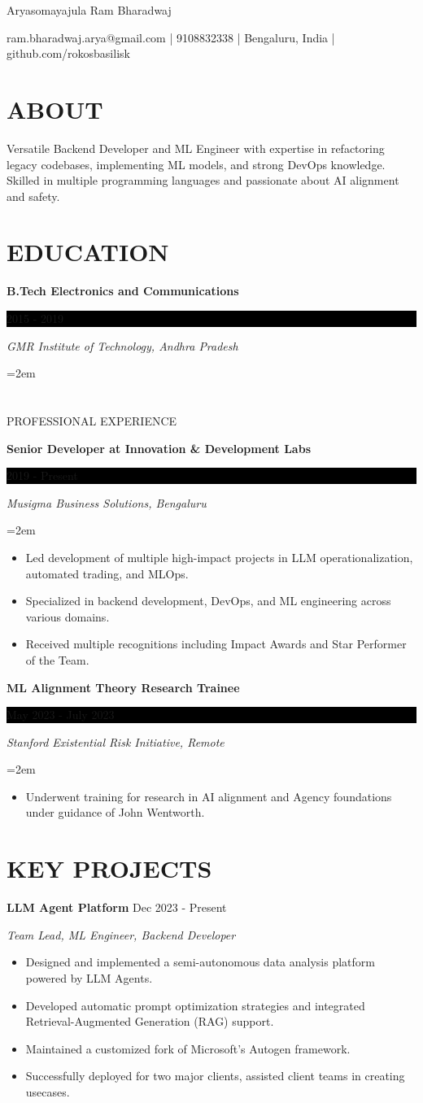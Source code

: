 \documentclass[fontsize=11pt]{article}
\newcommand{\sepspace}{\vspace*{1em}}
\newcommand{\MyName}[1]{
    \Huge \usefont{OT1}{phv}{b}{n} \hfill #1
    \par \normalsize \normalfont}
\newcommand{\NewPart}[1]{\section*{\uppercase{#1}}}
\newcommand{\EducationEntry}[4]{
    \noindent \textbf{#1} \hfill
    \colorbox{Black}{\parbox{8.5em}{\hfill\color{White}#2}} \par
    \noindent \textit{#3} \par
    \noindent\hangindent=2em\hangafter=0 \small #4
    \normalsize \par}
\newcommand{\WorkEntry}[4]{
    \noindent \textbf{#1} \hfill
    \colorbox{Black}{\parbox{9em}{\hfill\color{White}#2}} \par
    \noindent \textit{#3} \par
    \noindent\hangindent=2em\hangafter=0 \small #4
    \normalsize \par}
\newcommand{\ProjectEntry}[4]{
    \noindent \textbf{#1} \hfill {#2} \par
    \noindent \textit{#3} \par
    \noindent \small #4
    \normalsize \par}
\newcommand{\AboutEntry}[1]{
    \noindent #1 \par}
\begin{document}
\MyName{Aryasomayajula Ram Bharadwaj}
\bigskip

{\small \hfill ram.bharadwaj.arya@gmail.com | 9108832338 | Bengaluru, India | github.com/rokosbasilisk}

\NewPart{ABOUT}
\AboutEntry{Versatile Backend Developer and ML Engineer with expertise in refactoring legacy codebases, implementing ML models, and strong DevOps knowledge. Skilled in multiple programming languages and passionate about AI alignment and safety.}

\NewPart{EDUCATION}
\EducationEntry
{B.Tech Electronics and Communications}
{2015 - 2019}
{GMR Institute of Technology, Andhra Pradesh}

\NewPart{PROFESSIONAL EXPERIENCE}

\WorkEntry
{Senior Developer at Innovation \& Development Labs}
{2019 - Present}
{Musigma Business Solutions, Bengaluru}
{%
\begin{itemize}
\item Led development of multiple high-impact projects in LLM operationalization, automated trading, and MLOps.
\item Specialized in backend development, DevOps, and ML engineering across various domains.
\item Received multiple recognitions including Impact Awards and Star Performer of the Team.
\end{itemize}}

\sepspace

\WorkEntry
{ML Alignment Theory Research Trainee}
{May 2023 - July 2023}
{Stanford Existential Risk Initiative, Remote}
{%
\begin{itemize}
    \item Underwent training for research in AI alignment and Agency foundations under guidance of John Wentworth.
\end{itemize}}

\NewPart{KEY PROJECTS}

\ProjectEntry{LLM Agent Platform}{Dec 2023 - Present}{Team Lead, ML Engineer, Backend Developer}
{%
\begin{itemize}
\item Designed and implemented a semi-autonomous data analysis platform powered by LLM Agents.
\item Developed automatic prompt optimization strategies and integrated Retrieval-Augmented Generation (RAG) support.
\item Maintained a customized fork of Microsoft's Autogen framework.
\item Successfully deployed for two major clients, assisted client teams in creating usecases.
\end{itemize}}
\end{document}
